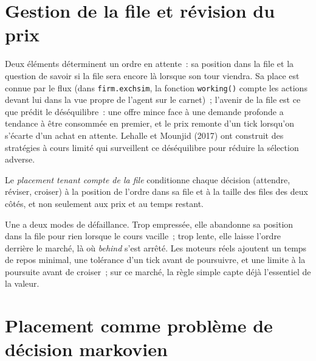 \section{Gestion de la file et révision du prix}

Deux éléments déterminent un ordre en attente~: sa position dans la file et la question de savoir si la file sera encore là lorsque son tour viendra. Sa place est connue par le flux
(dans \texttt{firm.exchsim}, la fonction \texttt{working()} compte les actions devant lui dans la vue propre de l'agent sur le carnet)~; l'avenir de la file est ce que
prédit le déséquilibre~: une offre mince face à une demande profonde a tendance à être consommée en premier, et le prix remonte d'un tick lorsqu'on s'écarte d'un achat en attente. Lehalle et Mounjid (2017) ont construit
des stratégies à cours limité qui surveillent ce déséquilibre pour réduire la sélection adverse.

\begin{definition}\label{def:mx:child-order-placement:qaware}
Le \emph{placement tenant compte de la file} conditionne chaque décision (attendre, réviser, croiser) à la position de l'ordre dans sa file et à la taille des files des deux côtés, et non
seulement aux prix et au temps restant.
\end{definition}

Une  a deux modes de défaillance. Trop empressée, elle abandonne sa position dans la file pour rien lorsque le cours vacille~; trop lente, elle laisse l'ordre derrière
le marché, là où \emph{behind} s'est arrêté. Les moteurs réels ajoutent un temps de repos minimal, une tolérance d'un tick avant de poursuivre, et une limite à la poursuite
avant de croiser~; sur ce marché, la règle simple capte déjà l'essentiel de la valeur.

\section{Placement comme problème de décision markovien}

